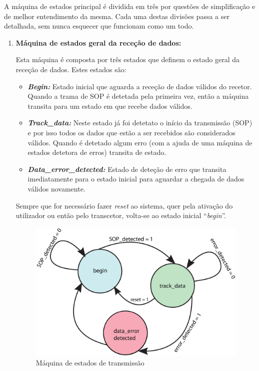\documentclass[11pt,a4paper]{article}
\begin{document}
	A máquina de estados principal é dividida em três por questões de simplificação e de melhor entendimento da mesma. Cada uma destas divisões passa a ser detalhada, sem nunca esquecer que funcionam como um todo.
	
	\begin{enumerate}
		\item \textbf{Máquina de estados geral da receção de dados:}
		
		Esta máquina é composta por três estados que definem o estado geral da receção de dados. Estes estados são:
		\begin{itemize}
			\item \textbf{\textit{Begin:}} Estado inicial que aguarda a receção de dados válidos do recetor. Quando a trama de SOP é detetada pela primeira vez, então a máquina transita para um estado em que recebe dados válidos. 
			
			\item \textbf{\textit{Track\_data:}} Neste estado já foi detetato o início da transmissão (SOP) e por isso todos os dados que estão a ser recebidos são considerados válidos. Quando é detetado algum erro (com a ajuda de uma máquina de estados detetora de erros) transita de estado.
			
			\item \textbf{\textit{Data\_error\_detected:} }Estado de deteção de erro que transita imediatamente para o estado inicial para aguardar a chegada de dados válidos novamente.
			
		\end{itemize}
		
		Sempre que for necessário fazer \textit{reset} ao sistema, quer pela ativação do utilizador ou então pelo transcetor, volta-se ao estado inicial ``\textit{begin}''.
		
		
		\begin{figure}[h!]
			\begin{center}
				\leavevmode
				\includegraphics[width=1.0\textwidth]{fsm1}
				\caption[Máquina de estados de transmissão]{Máquina de estados de transmissão}
				\label{fig:FSM1}
			\end{center}
		\end{figure}
		

\end{enumerate}
\end{document}
